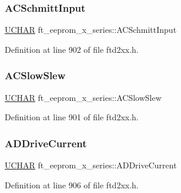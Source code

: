 \subsubsection{\texorpdfstring{A\+C\+Schmitt\+Input}{ACSchmittInput}}
{\footnotesize\ttfamily \hyperlink{CatCaloProto40MHz_2inc_2WinTypes_8h_a4f4bb67531a9bf6f0b9c6ad76aeba587}{U\+C\+H\+AR} ft\+\_\+eeprom\+\_\+x\+\_\+series\+::\+A\+C\+Schmitt\+Input}



Definition at line 902 of file ftd2xx.\+h.

\mbox{\label{structft__eeprom__x__series_aa08fe7573f5f822e12a34973055c52e3}} 
\subsubsection{\texorpdfstring{A\+C\+Slow\+Slew}{ACSlowSlew}}
{\footnotesize\ttfamily \hyperlink{CatCaloProto40MHz_2inc_2WinTypes_8h_a4f4bb67531a9bf6f0b9c6ad76aeba587}{U\+C\+H\+AR} ft\+\_\+eeprom\+\_\+x\+\_\+series\+::\+A\+C\+Slow\+Slew}



Definition at line 901 of file ftd2xx.\+h.

\mbox{\label{structft__eeprom__x__series_a22a0cc77e2bf346e29d171194a91bc95}} 
\subsubsection{\texorpdfstring{A\+D\+Drive\+Current}{ADDriveCurrent}}
{\footnotesize\ttfamily \hyperlink{CatCaloProto40MHz_2inc_2WinTypes_8h_a4f4bb67531a9bf6f0b9c6ad76aeba587}{U\+C\+H\+AR} ft\+\_\+eeprom\+\_\+x\+\_\+series\+::\+A\+D\+Drive\+Current}



Definition at line 906 of file ftd2xx.\+h.

\mbox{\label{structft__eeprom__x__series_addfb6cbf3c524edfbde9dbaf37f1f5e0}} 
